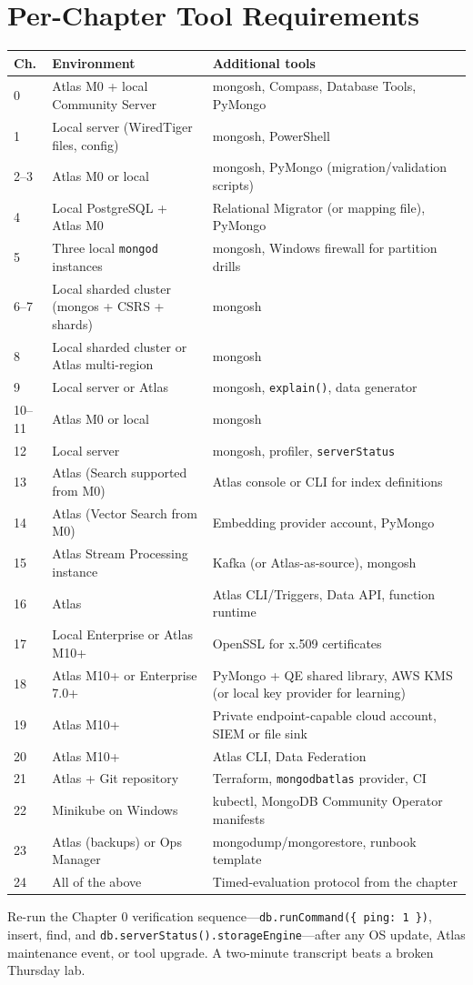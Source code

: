 \section{Per-Chapter Tool Requirements}
%
\begin{center}
\footnotesize
\begin{tabular}{@{}p{1.2cm}p{5.2cm}p{6.0cm}@{}}
\toprule
\textbf{Ch.} & \textbf{Environment} & \textbf{Additional tools} \\
\midrule
0 & Atlas M0 + local Community Server & mongosh, Compass, Database Tools, PyMongo \\
1 & Local server (WiredTiger files, config) & mongosh, PowerShell \\
2--3 & Atlas M0 or local & mongosh, PyMongo (migration/validation scripts) \\
4 & Local PostgreSQL + Atlas M0 & Relational Migrator (or mapping file), PyMongo \\
5 & Three local \texttt{mongod} instances & mongosh, Windows firewall for partition drills \\
6--7 & Local sharded cluster (mongos + CSRS + shards) & mongosh \\
8 & Local sharded cluster or Atlas multi-region & mongosh \\
9 & Local server or Atlas & mongosh, \texttt{explain()}, data generator \\
10--11 & Atlas M0 or local & mongosh \\
12 & Local server & mongosh, profiler, \texttt{serverStatus} \\
13 & Atlas (Search supported from M0) & Atlas console or CLI for index definitions \\
14 & Atlas (Vector Search from M0) & Embedding provider account, PyMongo \\
15 & Atlas Stream Processing instance & Kafka (or Atlas-as-source), mongosh \\
16 & Atlas & Atlas CLI/Triggers, Data API, function runtime \\
17 & Local Enterprise or Atlas M10+ & OpenSSL for x.509 certificates \\
18 & Atlas M10+ or Enterprise 7.0+ & PyMongo + QE shared library, AWS KMS (or local key provider for learning) \\
19 & Atlas M10+ & Private endpoint-capable cloud account, SIEM or file sink \\
20 & Atlas M10+ & Atlas CLI, Data Federation \\
21 & Atlas + Git repository & Terraform, \texttt{mongodbatlas} provider, CI \\
22 & Minikube on Windows & kubectl, MongoDB Community Operator manifests \\
23 & Atlas (backups) or Ops Manager & mongodump/mongorestore, runbook template \\
24 & All of the above & Timed-evaluation protocol from the chapter \\
\bottomrule
\end{tabular}
\end{center}

\begin{tipbox}
Re-run the Chapter 0 verification sequence---\texttt{db.runCommand(\{ ping: 1 \})}, insert, find,
and \texttt{db.serverStatus().storageEngine}---after any OS update, Atlas maintenance event, or
tool upgrade. A two-minute transcript beats a broken Thursday lab.
\end{tipbox}
